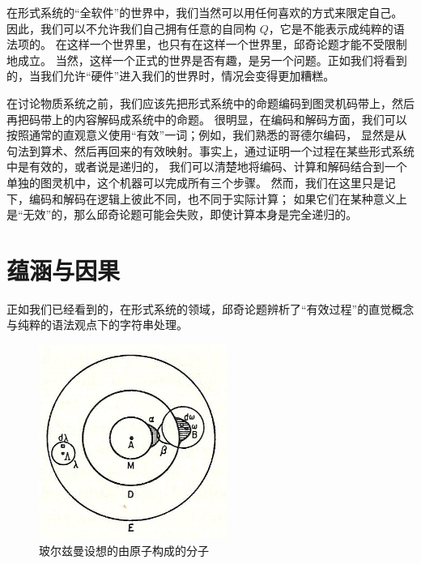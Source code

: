\documentclass[a4paper,12pt]{article}
\begin{document}
在形式系统的“全软件”的世界中，我们当然可以用任何喜欢的方式来限定自己。
因此，我们可以不允许我们自己拥有任意的自同构 $Q$，它是不能表示成纯粹的语法项的。
在这样一个世界里，也只有在这样一个世界里，邱奇论题才能不受限制地成立。
当然，这样一个正式的世界是否有趣，是另一个问题。正如我们将看到的，当我们允许“硬件”进入我们的世界时，情况会变得更加糟糕。

在讨论物质系统之前，我们应该先把形式系统中的命题编码到图灵机码带上，然后再把码带上的内容解码成系统中的命题。
很明显，在编码和解码方面，我们可以按照通常的直观意义使用“有效”一词；例如，我们熟悉的哥德尔编码，
显然是从句法到算术、然后再回来的有效映射。事实上，通过证明一个过程在某些形式系统中是有效的，或者说是递归的，
我们可以清楚地将编码、计算和解码结合到一个单独的图灵机中，这个机器可以完成所有三个步骤。
然而，我们在这里只是记下，编码和解码在逻辑上彼此不同，也不同于实际计算；
如果它们在某种意义上是“无效”的，那么邱奇论题可能会失败，即使计算本身是完全递归的。

\section{蕴涵与因果}

正如我们已经看到的，在形式系统的领域，邱奇论题辨析了“有效过程”的直觉概念与纯粹的语法观点下的字符串处理。

\begin{figure}[ht]
\centering
\includegraphics[height=2.5in]{images/boltzmanns_molecule.jpg}
\caption{玻尔兹曼设想的由原子构成的分子}
\end{figure}
\end{document}
